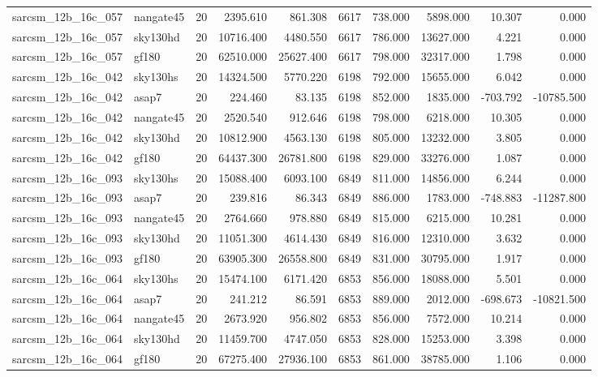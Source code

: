 \begin{longtable}{llrrrrrrrr}
sarcsm\_12b\_16c\_057 & nangate45 & 20 & 2395.610 & 861.308 & 6617 & 738.000 & 5898.000 & 10.307 & 0.000 \\
sarcsm\_12b\_16c\_057 & sky130hd & 20 & 10716.400 & 4480.550 & 6617 & 786.000 & 13627.000 & 4.221 & 0.000 \\
sarcsm\_12b\_16c\_057 & gf180 & 20 & 62510.000 & 25627.400 & 6617 & 798.000 & 32317.000 & 1.798 & 0.000 \\
sarcsm\_12b\_16c\_042 & sky130hs & 20 & 14324.500 & 5770.220 & 6198 & 792.000 & 15655.000 & 6.042 & 0.000 \\
sarcsm\_12b\_16c\_042 & asap7 & 20 & 224.460 & 83.135 & 6198 & 852.000 & 1835.000 & -703.792 & -10785.500 \\
sarcsm\_12b\_16c\_042 & nangate45 & 20 & 2520.540 & 912.646 & 6198 & 798.000 & 6218.000 & 10.305 & 0.000 \\
sarcsm\_12b\_16c\_042 & sky130hd & 20 & 10812.900 & 4563.130 & 6198 & 805.000 & 13232.000 & 3.805 & 0.000 \\
sarcsm\_12b\_16c\_042 & gf180 & 20 & 64437.300 & 26781.800 & 6198 & 829.000 & 33276.000 & 1.087 & 0.000 \\
sarcsm\_12b\_16c\_093 & sky130hs & 20 & 15088.400 & 6093.100 & 6849 & 811.000 & 14856.000 & 6.244 & 0.000 \\
sarcsm\_12b\_16c\_093 & asap7 & 20 & 239.816 & 86.343 & 6849 & 886.000 & 1783.000 & -748.883 & -11287.800 \\
sarcsm\_12b\_16c\_093 & nangate45 & 20 & 2764.660 & 978.880 & 6849 & 815.000 & 6215.000 & 10.281 & 0.000 \\
sarcsm\_12b\_16c\_093 & sky130hd & 20 & 11051.300 & 4614.430 & 6849 & 816.000 & 12310.000 & 3.632 & 0.000 \\
sarcsm\_12b\_16c\_093 & gf180 & 20 & 63905.300 & 26558.800 & 6849 & 831.000 & 30795.000 & 1.917 & 0.000 \\
sarcsm\_12b\_16c\_064 & sky130hs & 20 & 15474.100 & 6171.420 & 6853 & 856.000 & 18088.000 & 5.501 & 0.000 \\
sarcsm\_12b\_16c\_064 & asap7 & 20 & 241.212 & 86.591 & 6853 & 889.000 & 2012.000 & -698.673 & -10821.500 \\
sarcsm\_12b\_16c\_064 & nangate45 & 20 & 2673.920 & 956.802 & 6853 & 856.000 & 7572.000 & 10.214 & 0.000 \\
sarcsm\_12b\_16c\_064 & sky130hd & 20 & 11459.700 & 4747.050 & 6853 & 828.000 & 15253.000 & 3.398 & 0.000 \\
sarcsm\_12b\_16c\_064 & gf180 & 20 & 67275.400 & 27936.100 & 6853 & 861.000 & 38785.000 & 1.106 & 0.000 \\

\end{longtable}
